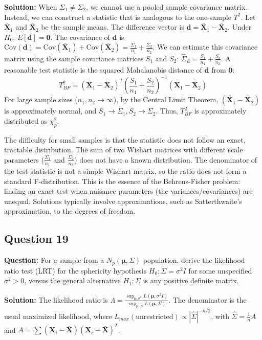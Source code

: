 \textbf{Solution:}
When $\Sigma_1 \neq \Sigma_2$, we cannot use a pooled sample covariance matrix. Instead, we can construct a statistic that is analogous to the one-sample $T^2$.
Let $\bar{\mathbf{X}}_1$ and $\bar{\mathbf{X}}_2$ be the sample means. The difference vector is $\mathbf{d} = \bar{\mathbf{X}}_1 - \bar{\mathbf{X}}_2$.
Under $H_0$, $E[\mathbf{d}] = \mathbf{0}$.
The covariance of $\mathbf{d}$ is $\text{Cov}(\mathbf{d}) = \text{Cov}(\bar{\mathbf{X}}_1) + \text{Cov}(\bar{\mathbf{X}}_2) = \frac{\Sigma_1}{n_1} + \frac{\Sigma_2}{n_2}$.
We can estimate this covariance matrix using the sample covariance matrices $S_1$ and $S_2$: $\hat{\Sigma}_{\mathbf{d}} = \frac{S_1}{n_1} + \frac{S_2}{n_2}$.
A reasonable test statistic is the squared Mahalanobis distance of $\mathbf{d}$ from $\mathbf{0}$:
$$ T^2_{BF} = (\bar{\mathbf{X}}_1 - \bar{\mathbf{X}}_2)^T \left( \frac{S_1}{n_1} + \frac{S_2}{n_2} \right)^{-1} (\bar{\mathbf{X}}_1 - \bar{\mathbf{X}}_2) $$
For large sample sizes ($n_1, n_2 \to \infty$), by the Central Limit Theorem, $(\bar{\mathbf{X}}_1 - \bar{\mathbf{X}}_2)$ is approximately normal, and $S_1 \to \Sigma_1, S_2 \to \Sigma_2$. Thus, $T^2_{BF}$ is approximately distributed as $\chi^2_p$.

The difficulty for small samples is that the statistic does not follow an exact, tractable distribution. The sum of two Wishart matrices with different scale parameters ($\frac{\Sigma_1}{n_1}$ and $\frac{\Sigma_2}{n_2}$) does not have a known distribution. The denominator of the test statistic is not a simple Wishart matrix, so the ratio does not form a standard F-distribution. This is the essence of the Behrens-Fisher problem: finding an exact test when nuisance parameters (the variances/covariances) are unequal. Solutions typically involve approximations, such as Satterthwaite's approximation, to the degrees of freedom.

\subsection*{Question 19}
\textbf{Question:} For a sample from a $N_p(\boldsymbol{\mu}, \Sigma)$ population, derive the likelihood ratio test (LRT) for the sphericity hypothesis $H_0: \Sigma = \sigma^2 I$ for some unspecified $\sigma^2 > 0$, versus the general alternative $H_1: \Sigma$ is any positive definite matrix.

\textbf{Solution:}
The likelihood ratio is $\Lambda = \frac{\sup_{\boldsymbol{\mu}, \sigma^2} L(\boldsymbol{\mu}, \sigma^2 I)}{\sup_{\boldsymbol{\mu}, \Sigma} L(\boldsymbol{\mu}, \Sigma)}$.
The denominator is the usual maximized likelihood, where $L_{max}(\text{unrestricted}) \propto |\hat{\Sigma}|^{-n/2}$, with $\hat{\Sigma} = \frac{1}{n}A$ and $A=\sum(\mathbf{X}_i-\bar{\mathbf{X}})(\mathbf{X}_i-\bar{\mathbf{X}})^T$.

